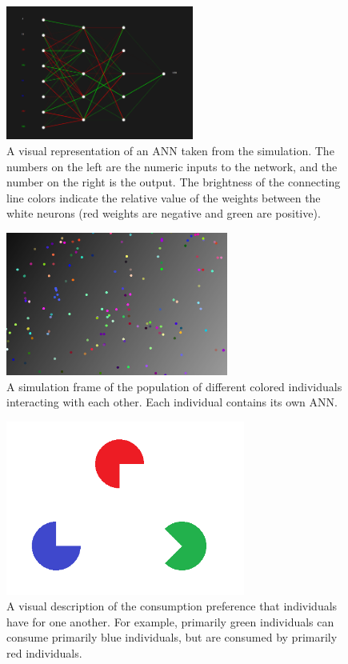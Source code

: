 \documentclass[12pt]{article} %
\begin{document}
\begin{figure}[ht]
\centering
\includegraphics[width=0.55\textwidth]{ANN.png}
\caption{
A visual representation of an ANN taken from the simulation.  The numbers on the left are the numeric inputs to the network, and the number on the right is the output.  The brightness of the connecting line colors indicate the relative value of the weights between the white neurons (red weights are negative and green are positive).
\newline
\newline
}
\end{figure}


\begin{figure}[ht]
\centering
\includegraphics[width=0.65\textwidth]{population.png}
\caption{
A simulation frame of the population of different colored individuals interacting with each other. Each individual contains its own ANN.
}
\end{figure}


\begin{figure}[ht]
\centering
\includegraphics[width=0.7\textwidth]{diet.png}
\caption{
A visual description of the consumption preference that individuals have for one another.  For example, primarily green individuals can consume primarily blue individuals, but are consumed by primarily red individuals.
}
\end{figure}
\end{document}
